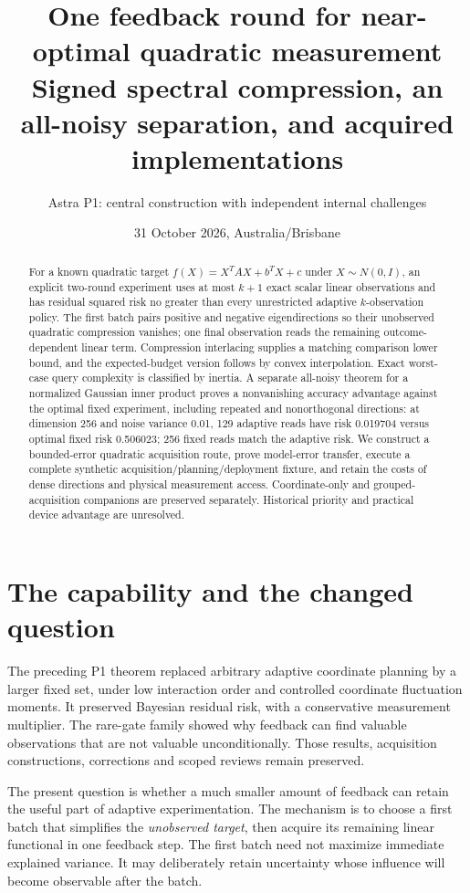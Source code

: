 \documentclass[11pt,a4paper]{article}
\title{\textbf{One feedback round for near-optimal quadratic measurement}\\[5pt]
\large Signed spectral compression, an all-noisy separation, and acquired implementations}
\author{Astra P1: central construction with independent internal challenges}
\date{31 October 2026, Australia/Brisbane}
\begin{document}
\maketitle
\begin{abstract}
For a known quadratic target $f(X)=X^TAX+b^TX+c$ under $X\sim N(0,I)$, an explicit two-round experiment uses at most $k+1$ exact scalar linear observations and has residual squared risk no greater than every unrestricted adaptive $k$-observation policy. The first batch pairs positive and negative eigendirections so their unobserved quadratic compression vanishes; one final observation reads the remaining outcome-dependent linear term. Compression interlacing supplies a matching comparison lower bound, and the expected-budget version follows by convex interpolation. Exact worst-case query complexity is classified by inertia. A separate all-noisy theorem for a normalized Gaussian inner product proves a nonvanishing accuracy advantage against the optimal fixed experiment, including repeated and nonorthogonal directions: at dimension 256 and noise variance 0.01, 129 adaptive reads have risk 0.019704 versus optimal fixed risk 0.506023; 256 fixed reads match the adaptive risk. We construct a bounded-error quadratic acquisition route, prove model-error transfer, execute a complete synthetic acquisition/planning/deployment fixture, and retain the costs of dense directions and physical measurement access. Coordinate-only and grouped-acquisition companions are preserved separately. Historical priority and practical device advantage are unresolved.
\end{abstract}

\section{The capability and the changed question}

The preceding P1 theorem replaced arbitrary adaptive coordinate planning by a larger fixed set, under low interaction order and controlled coordinate fluctuation moments. It preserved Bayesian residual risk, with a conservative measurement multiplier. The rare-gate family showed why feedback can find valuable observations that are not valuable unconditionally. Those results, acquisition constructions, corrections and scoped reviews remain preserved.

The present question is whether a much smaller amount of feedback can retain the useful part of adaptive experimentation. The mechanism is to choose a first batch that simplifies the \emph{unobserved target}, then acquire its remaining linear functional in one feedback step. The first batch need not maximize immediate explained variance. It may deliberately retain uncertainty whose influence will become observable after the batch.
\end{document}
